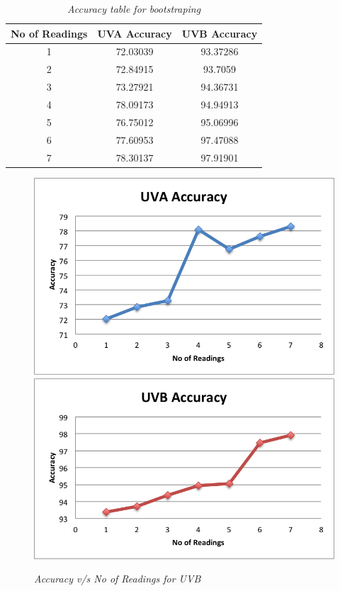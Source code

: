 \documentclass[12pt,fullpage,doublespace]{article}
\begin{document}
\newpage
\begin{table}
\centering
\begin{tabular}{|c|c|c|}
\hline
No of Readings & UVA Accuracy & UVB Accuracy \\
\hline 
1 & 72.03039 & 93.37286\\
\hline
2 & 72.84915 & 93.7059 \\
\hline
3 & 73.27921	& 94.36731\\
\hline
4 & 78.09173	& 94.94913\\
\hline
5 & 76.75012 & 95.06996 \\
\hline
6 & 77.60953 & 97.47088 \\
\hline
7 & 78.30137 & 97.91901\\
\hline
\end{tabular}
\caption{\small \sl Accuracy table for bootstraping}
\end{table}


\begin{figure}
\begin{center}
\includegraphics[scale=0.5]{uvaAccuracy.png}
\includegraphics[scale=0.55]{uvbAccuracy.png}
\caption{\small \sl Accuracy v/s No of Readings for UVB}
\label{fig:lessReadings}
\end{center}
\end{figure}
\end{document}
